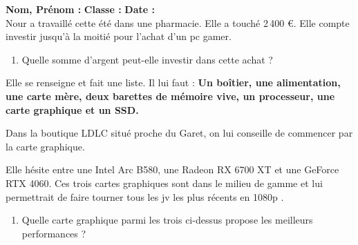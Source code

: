 



\textbf{Nom, Prénom :} \hspace{8cm} \textbf{Classe :} \hspace{3cm} \textbf{Date :}\\

Nour a travaillé cette été dans une pharmacie. Elle a touché 2\,400 \euro{}. Elle compte investir jusqu'à la moitié pour l'achat d'un pc gamer. 

\begin{enumerate}
  \item[1.] Quelle somme d'argent peut-elle investir dans cette achat ?
\end{enumerate}
\Pointilles[2]

\begin{multicols}{2}
Elle se renseigne et fait une liste. Il lui faut : \textbf{Un boîtier, une alimentation, une carte mère, deux barettes de mémoire vive, un processeur, une carte graphique et un SSD.}


Dans la boutique LDLC situé proche du Garet, on lui conseille de commencer par la carte graphique. 

Elle hésite entre une Intel Arc B580, une Radeon RX 6700 XT et une GeForce RTX 4060. Ces trois cartes graphiques sont dans le milieu de gamme et lui permettrait de faire tourner \og tous les jv les plus récents en 1080p \fg{}. 

\begin{enumerate}
  \item[2.] Quelle carte graphique parmi les trois ci-dessus propose les meilleurs performances ?
\end{enumerate}

\Pointilles[4] \columnbreak


\end{multicols}
